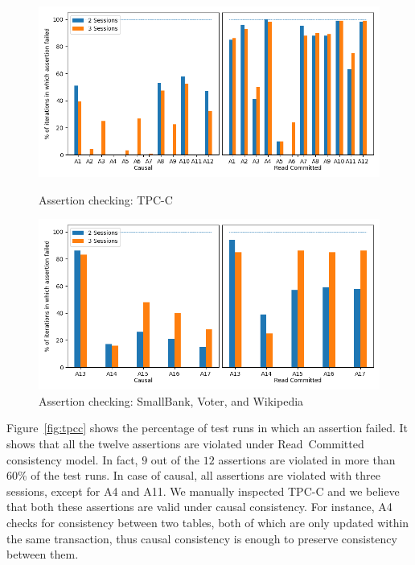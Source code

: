 \begin{figure}[!ht]
    \centering
    \begin{minipage}{\textwidth}
        \centering
    	\includegraphics[scale=0.4]{Sources/sql/plots/random_strongest_tpcc.png}
	    \caption{Assertion checking: {TPC-C}}
        \label{fig:tpcc}
	\end{minipage}
	
    \begin{minipage}{\textwidth}
        \centering
		\includegraphics[scale=0.4]{Sources/sql/plots/random_strongest_all.png}
	    \caption{Assertion checking: SmallBank, Voter, and Wikipedia}
    \label{fig:rest}
    \end{minipage}
\end{figure}

Figure~\ref{fig:tpcc} %
shows the percentage of test runs in which an assertion failed. 
It shows that all the twelve assertions are violated under
Read~Committed consistency model. In fact, $9$ out of the $12$ 
assertions are violated in more than 60\% of the test runs.
In case of causal, %
all assertions are violated
with three sessions, except for A4 and A11. We manually inspected TPC-C and
we believe that both these assertions are valid under causal consistency. 
For instance, A4 checks for consistency between two tables, both of which are
only updated within the same transaction, thus causal consistency is enough to
preserve consistency between them.


